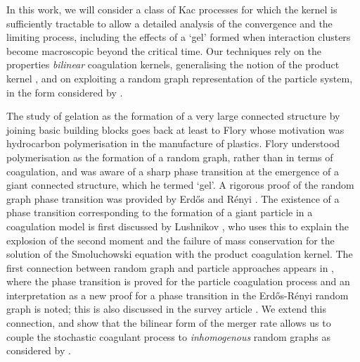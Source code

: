 \documentclass[11pt, notitlepage]{article}
\begin{document}
In this work, we will consider a class of Kac processes for which the kernel is sufficiently tractable to allow a detailed analysis of the convergence and the limiting process, including the effects of a `gel' formed when interaction clusters become macroscopic beyond the critical time. Our techniques rely on the properties \emph{bilinear} coagulation kernels, generalising the notion of the product kernel \cite{N00}, and on exploiting a random graph representation of the particle system, in the form considered by \cite{BJR07}.

The study of gelation as the formation of a very large connected structure by joining basic building blocks goes back at least to Flory \cite{Flo41} whose motivation was hydrocarbon polymerisation in the manufacture of plastics.
Flory understood polymerisation as the formation of a random graph, rather than in terms of coagulation, and was aware of a sharp phase transition at the emergence of a giant connected structure, which he termed `gel'.
A rigorous proof of the random graph phase transition was provided by Erd\H{o}s and R\'enyi \cite{ER60}.
The existence of a phase transition corresponding to the formation of a giant particle in a coagulation model is first discussed by Lushnikov \cite{L78}, who uses this to explain the explosion of the second moment and the failure of mass conservation for the solution of the Smoluchowski equation with the product coagulation kernel.
The first connection between random graph and particle approaches appears in \cite{BP91}, where the phase transition is proved for the particle coagulation process and an interpretation as a new proof for a phase transition in the Erd\H{o}s-R\'enyi random graph is noted; this is also discussed in the survey article \cite{A99}.
We extend this connection, and show that the bilinear form of the merger rate allows us to couple the stochastic coagulant process to \emph{inhomogenous} random graphs as considered by \cite{BJR07}.
\end{document}
